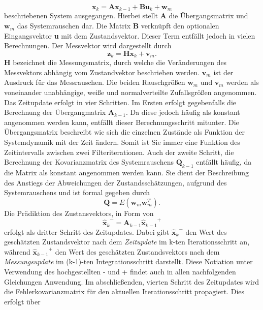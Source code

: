 \begin{equation}\label{xk}
  \mathbf{x}_k = \mathbf{Ax}_{k-1} + \mathbf{Bu}_k + \mathbf{w}_{m}
\end{equation}
beschriebenen System ausgegangen. Hierbei stellt \textbf{A} die Übergangsmatrix und $\mathbf{w}_m$ das Systemrauschen dar. Die Matrix \textbf{B} verknüpft den optionalen Eingangsvektor \textbf{u} mit dem Zustandsvektor. Dieser Term entfällt jedoch in vielen Berechnungen. Der Messvektor wird dargestellt durch
\begin{equation}\label{zk}
  \mathbf{z}_k = \mathbf{H}\mathbf{x}_k+\mathbf{v}_m .
\end{equation}
$\mathbf{H}$ bezeichnet die Messungsmatrix, durch welche die Veränderungen des Messvektors abhängig vom Zustandvektor beschrieben werden. $\mathbf{v}_m$ ist der Ausdruck für das Messrauschen. Die beiden Rauschgrößen $\mathbf{w}_m$ und $\mathbf{v}_m$ werden als voneinander unabhängige, weiße und normalverteilte Zufallsgrößen angenommen. \cite{P24}
\\Das Zeitupdate erfolgt in vier Schritten. Im Ersten erfolgt gegebenfalls die Berechnung der Übergangmatrix $\mathbf{A}_{k-1}$. Da diese jedoch häufig als konstant angenommen werden kann, entfällt dieser Berechnungsschritt mitunter. Die Übergangsmatrix beschreibt wie sich die einzelnen Zustände als Funktion der Systemdynamik mit der Zeit ändern. Somit ist Sie immer eine Funktion des Zeitintervalls zwischen zwei Filteriterationen. Auch der zweite Schritt, die Berechnung der Kovarianzmatrix des Systemrauschens $\mathbf{Q}_{k-1}$ entfällt häufig, da die Matrix als konstant angenommen werden kann. Sie dient der Beschreibung des Anstiegs der Abweichungen der Zustandsschätzungen, aufgrund des Systemrauschens und ist formal gegeben durch
\begin{equation}\label{Q}
  \mathbf{Q} = E(\mathbf{w}_m \mathbf{w}_m^T).
\end{equation}
Die Prädiktion des Zustansvektors, in Form von
\begin{equation}\label{xk-}
  {\mathbf{\hat x}_{k}}^- = \mathbf{A}_{k-1}{\mathbf{\hat x}_{k-1}}^+
\end{equation}
erfolgt als dritter Schritt des Zeitupdates. Dabei gibt $ {\mathbf{\hat x}_{k}}^- $ den Wert des geschätzten Zustandsvektor nach dem \textit{Zeitupdate} im k-ten Iterationsschritt an, während ${\mathbf{\hat x}_{k-1}}^+$ den Wert des geschätzten Zustandsvektors nach dem \textit{Messungsupdate} im (k-1)-ten Integrationsschritt darstellt. Diese Notiation unter Verwendung des hochgestellten - und + findet auch in allen nachfolgenden Gleichungen Anwendung. Im abschließenden, vierten Schritt des Zeitupdates wird die Fehlerkovarianzmatrix für den aktuellen Iterationsschritt propagiert. Dies erfolgt über
